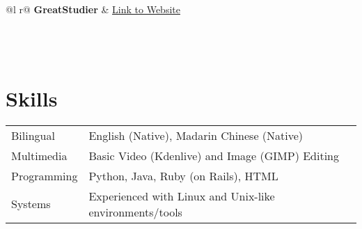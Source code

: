 \documentclass[letter, 12pt]{article}
\begin{document}
\begin{tabularx}{\linewidth}{ @{}l r@{} }
    \textbf{GreatStudier} & \hfill \href{https://github.com/greatericontop/GreatStudier}{Link to Website} \\[3.75pt]
     \\
     \\
     \\
\end{tabularx}

\section{Skills}
\begin{tabularx}{\linewidth}{@{}l X@{}}
    Bilingual &  English (Native), Madarin Chinese (Native) \\
    Multimedia & Basic Video (Kdenlive) and Image (GIMP) Editing \\
    Programming & Python, Java, Ruby (on Rails), HTML \\
    Systems & Experienced with Linux and Unix-like environments/tools \\
\end{tabularx}

\vfill
{}
\end{document}
